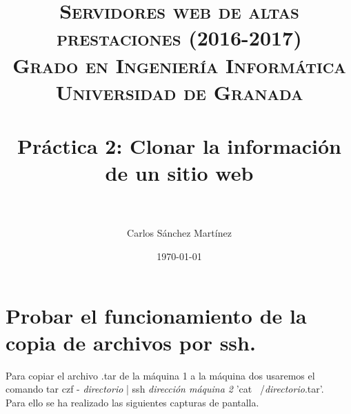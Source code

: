


\title{
\normalfont \normalsize
\textsc{{\bf Servidores web de altas prestaciones (2016-2017)} \\ Grado en Ingeniería Informática \\ Universidad de Granada} \\ [25pt] %
\horrule{0.5pt} \\[0.4cm] %
\huge Práctica 2:  Clonar la información de un sitio web\\ %
\horrule{2pt} \\[0.5cm] %
}

\author{Carlos Sánchez Martínez} %

\date{\normalsize\today} %




\maketitle %

\newpage %

\tableofcontents %

\listoffigures

\listoftables

\newpage





\section{ Probar el funcionamiento de la copia de archivos por ssh. }

	Para copiar el archivo .tar de la máquina 1 a la máquina dos usaremos el comando tar czf - \textit{directorio} | ssh \textit{dirección máquina 2} 'cat ~/\textit{directorio}.tar'.\\
  Para ello se ha realizado las siguientes capturas de pantalla.\\

